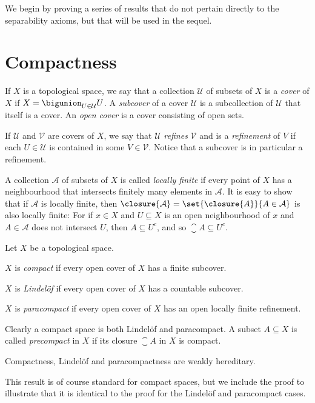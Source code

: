 \documentclass[article, a4paper, 11pt, oneside]{memoir}
\numberwithin{equation}{chapter}
\newcommand{\calU}{\mathcal{U}}
\newcommand{\calV}{\mathcal{V}}
\begin{document}
We begin by proving a series of results that do not pertain directly to the separability axioms, but that will be used in the sequel.


\section{Compactness}

\newcommand{\calA}{\mathcal{A}}

If $X$ is a topological space, we say that a collection $\calU$ of subsets of $X$ is a \emph{cover} of $X$ if $X = \bigunion_{U \in \calU} U$. A \emph{subcover} of a cover $\calU$ is a subcollection of $\calU$ that itself is a cover. An \emph{open cover} is a cover consisting of open sets.

If $\calU$ and $\calV$ are covers of $X$, we say that $\calU$ \emph{refines} $\calV$ and is a \emph{refinement} of $V$ if each $U \in \calU$ is contained in some $V \in \calV$. Notice that a subcover is in particular a refinement.

A collection $\calA$ of subsets of $X$ is called \emph{locally finite} if every point of $X$ has a neighbourhood that intersects finitely many elements in $\calA$. It is easy to show that if $\calA$ is locally finite, then $\closure{\calA} = \set{\closure{A}}{A \in \calA}$ is also locally finite: For if $x \in X$ and $U \subseteq X$ is an open neighbourhood of $x$ and $A \in \calA$ does not intersect $U$, then $A \subseteq U^c$, and so $\closure{A} \subseteq U^c$.

\begin{definition}
    Let $X$ be a topological space.
    \begin{enumdef}
        \item $X$ is \emph{compact} if every open cover of $X$ has a finite subcover.

        \item $X$ is \emph{Lindelöf} if every open cover of $X$ has a countable subcover.

        \item $X$ is \emph{paracompact} if every open cover of $X$ has an open locally finite refinement.
    \end{enumdef}
\end{definition}
%
Clearly a compact space is both Lindelöf and paracompact. A subset $A \subseteq X$ is called \emph{precompact} in $X$ if its closure $\closure{A}$ in $X$ is compact.


\begin{proposition}
    \label{thm:compact-Lindelof-closed-subset}
    Compactness, Lindelöf and paracompactness are weakly hereditary.
\end{proposition}
%
This result is of course standard for compact spaces, but we include the proof to illustrate that it is identical to the proof for the Lindelöf and paracompact cases.
\end{document}
